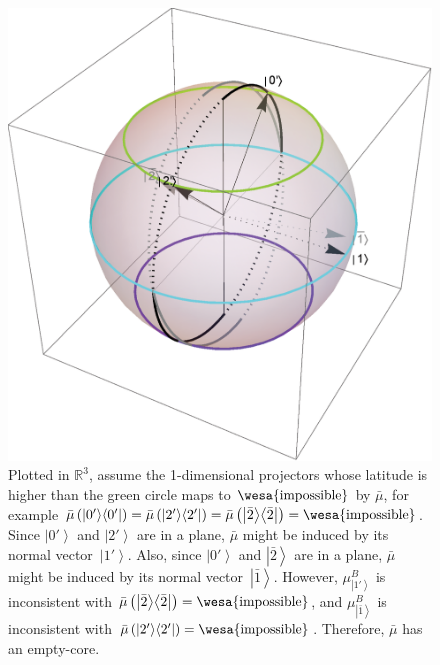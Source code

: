 \documentclass[12pt]{iopart}
\theoremstyle{remark}
\newcommand{\imposs}{{\mbox{\wesa{impossible}}}}
\newcommand{\ket}[1]{{\left\vert{#1}\right\rangle}}
\newcommand{\op}[2]{\ensuremath{\left\vert{#1}\middle\rangle\middle\langle{#2}\right\vert}}
\newcommand{\proj}[1]{\op{#1}{#1}}
\begin{document}
\begin{figure}
\begin{centering}
\includegraphics[scale=0.38]{figure3.eps} 
\par\end{centering}
\caption{\label{fig:three-dimensional-3-value-1}Plotted in $\mathbb{R}^{3}$,
assume the 1-dimensional projectors whose latitude is higher than
the green circle maps to $\imposs$ by $\bar{\mu}$, for example $\bar{\mu}\left(\proj{0'}\right)=\bar{\mu}\left(\proj{2'}\right)=\bar{\mu}\left(\proj{\bar{2}}\right)=\imposs$.
Since $\ket{0'}$ and $\ket{2'}$ are in a plane, $\bar{\mu}$ might
be induced by its normal vector~$\ket{1'}$. Also, since $\ket{0'}$
and $\ket{\bar{2}}$ are in a plane, $\bar{\mu}$ might be induced
by its normal vector~$\ket{\bar{1}}$. However, $\mu_{\ket{1'}}^{B}$
is inconsistent with $\bar{\mu}\left(\proj{\bar{2}}\right)=\imposs$,
and $\mu_{\ket{\bar{1}}}^{B}$ is inconsistent with $\bar{\mu}\left(\proj{2'}\right)=\imposs$.
Therefore, $\bar{\mu}$ has an empty-core.}
\end{figure}
\end{document}
